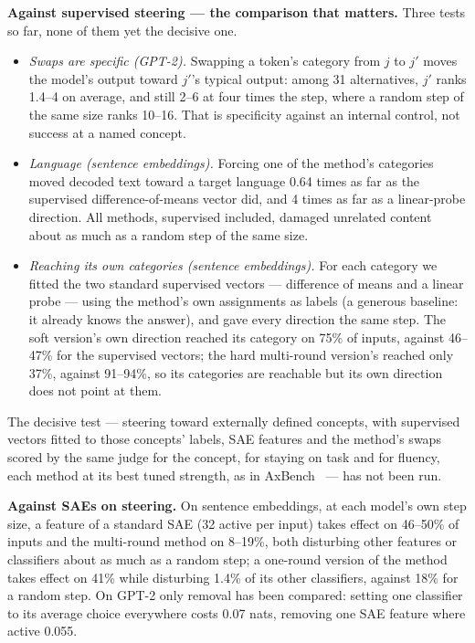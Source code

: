 \documentclass[11pt]{article}
\begin{document}
\textbf{Against supervised steering --- the comparison that matters.}
Three tests so far, none of them yet the decisive one.
\begin{itemize}
\item \emph{Swaps are specific (GPT-2).} Swapping a token's category from
$j$ to $j'$ moves the model's output toward $j'$'s typical output: among 31
alternatives, $j'$ ranks 1.4--4 on average, and still 2--6 at four times
the step, where a random step of the same size ranks 10--16. That is
specificity against an internal control, not success at a named concept.
\item \emph{Language (sentence embeddings).} Forcing one of the method's
categories moved decoded text toward a target language 0.64 times as far
as the supervised difference-of-means vector did, and 4 times as far as
a linear-probe direction. All methods, supervised included, damaged
unrelated content about as much as a random step of the same size.
\item \emph{Reaching its own categories (sentence embeddings).} For each
category we fitted the two standard supervised vectors --- difference of
means and a linear probe --- using the method's own assignments as labels
(a generous baseline: it already knows the answer), and gave every
direction the same step. The soft version's own direction reached its
category on 75\% of inputs, against 46--47\% for the supervised vectors;
the hard multi-round version's reached only 37\%, against 91--94\%, so its
categories are reachable but its own direction does not point at them.
\end{itemize}
The decisive test --- steering toward externally defined concepts, with
supervised vectors fitted to those concepts' labels, SAE features and the
method's swaps scored by the same judge for the concept, for staying on
task and for fluency, each method at its best tuned strength, as in
AxBench~\cite{wu2025axbenchsteeringllmssimple} --- has not been run.

\textbf{Against SAEs on steering.} On sentence embeddings, at each model's
own step size, a feature of a standard SAE (32 active per input) takes
effect on 46--50\% of inputs and the multi-round method on 8--19\%, both
disturbing other features or classifiers about as much as a random step;
a one-round version of the method takes effect on 41\% while disturbing
1.4\% of its other classifiers, against 18\% for a random step. On GPT-2
only removal has been compared: setting one classifier to its average
choice everywhere costs 0.07 nats, removing one SAE feature where active
0.055.
\end{document}
